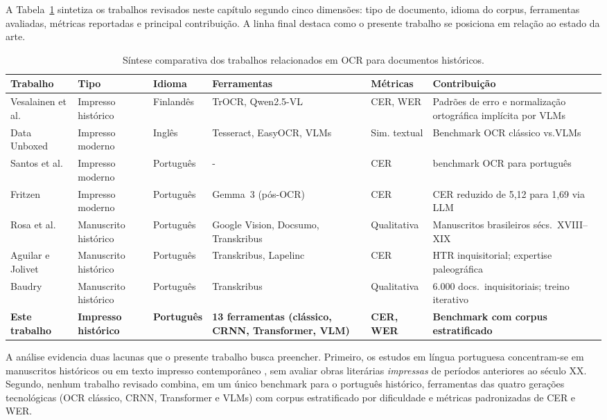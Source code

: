 \documentclass[
  12pt,
  oneside,
  a4paper,
  chapter=TITLE,
  section=TITLE,
  english,
  brazil
]{abntex2}
\begin{document}
A Tabela~\ref{tab:trabalhos_relacionados} sintetiza os trabalhos revisados neste
capítulo segundo cinco dimensões: tipo de documento, idioma do corpus, ferramentas
avaliadas, métricas reportadas e principal contribuição. A linha final destaca como
o presente trabalho se posiciona em relação ao estado da arte.

\begin{table}[H]
\centering
\caption{Síntese comparativa dos trabalhos relacionados em OCR para documentos
históricos.}
\label{tab:trabalhos_relacionados}
\renewcommand{\arraystretch}{1.4}
\begin{tabular}{p{2.5cm} p{2.2cm} p{2cm} p{2.8cm} p{2cm} p{3.0cm}}
\hline
\textbf{Trabalho} &
\textbf{Tipo} &
\textbf{Idioma} &
\textbf{Ferramentas} &
\textbf{Métricas} &
\textbf{Contribuição} \\
\hline
Vesalainen et al.\ \cite{vesalainen2025} &
  Impresso histórico & Finlandês &
  TrOCR, Qwen2.5-VL & CER, WER &
  Padrões de erro e normalização ortográfica implícita por VLMs \\
\hline
Data Unboxed \cite{dataunboxed2025} &
  Impresso moderno & Inglês &
  Tesseract, EasyOCR, VLMs & Sim. textual &
  Benchmark OCR clássico vs.VLMs \\
\hline
Santos et al.\ \cite{santos2023} &
  Impresso moderno & Português &
    - & CER &
  benchmark OCR para português \\
\hline
Fritzen \cite{fritzen2025} &
  Impresso moderno & Português &
  Gemma~3 (pós-OCR) & CER &
  CER reduzido de 5,12 para 1,69 via LLM \\
\hline
Rosa et al.\ \cite{rosa2025} &
  Manuscrito histórico & Português &
  Google Vision, Docsumo, Transkribus & Qualitativa &
  Manuscritos brasileiros sécs.\ XVIII--XIX \\
\hline
Aguilar e Jolivet \cite{aguilar2024} &
  Manuscrito histórico & Português &
  Transkribus, Lapelinc & CER &
  HTR inquisitorial; expertise paleográfica \\
\hline
Baudry \cite{baudry2023} &
  Manuscrito histórico & Português &
  Transkribus & Qualitativa &
  6.000 docs.\ inquisitoriais; treino iterativo \\
\hline
\textbf{Este trabalho} &
  \textbf{Impresso histórico} & \textbf{Português} &
  \textbf{13 ferramentas (clássico, CRNN, Transformer, VLM)} &
  \textbf{CER, WER} &
  \textbf{Benchmark com corpus estratificado} \\
\hline
\end{tabular}
\end{table}
A análise evidencia duas lacunas que o presente trabalho busca preencher. Primeiro,
os estudos em língua portuguesa concentram-se em manuscritos históricos
\cite{rosa2025,aguilar2024,baudry2023} ou em texto impresso contemporâneo
\cite{santos2023,fritzen2025}, sem avaliar obras literárias \textit{impressas}
de períodos anteriores ao século XX. Segundo, nenhum trabalho revisado combina, em um
único benchmark para o português histórico, ferramentas das quatro gerações tecnológicas
(OCR clássico, CRNN, Transformer e VLMs) com corpus estratificado por dificuldade
e métricas padronizadas de CER e WER.
\end{document}
